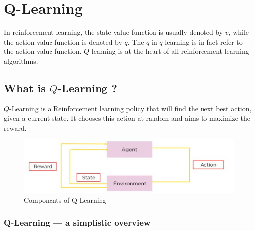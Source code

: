 
\chapter{Q-Learning}





In reinforcement learning, the state-value function is usually denoted by $v$, 
while the action-value function is denoted by $q$.
The $q$ in $q$-learning is in fact refer to the action-value function. 
$Q$-learning is at the heart of all reinforcement learning algorithms.

\section{What is $Q$-Learning ?}

$Q$-Learning is a Reinforcement learning policy that will find the next best action, 
given a current state. It chooses this action at random and aims to maximize the reward.

\begin{figure}[!htb]
\centering
\includegraphics[scale=0.618]{pix/q_learning/3-components-q.jpg}
\caption{Components of Q-Learning}
\end{figure}



\subsection{Q-Learning — a simplistic overview}

